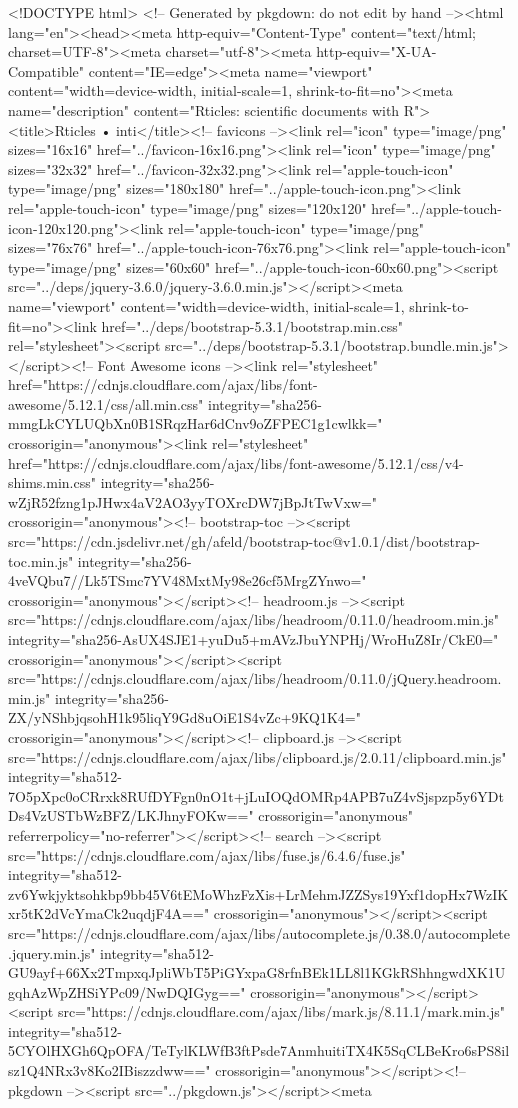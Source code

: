 <!DOCTYPE html>
<!-- Generated by pkgdown: do not edit by hand --><html lang="en"><head><meta http-equiv="Content-Type" content="text/html; charset=UTF-8"><meta charset="utf-8"><meta http-equiv="X-UA-Compatible" content="IE=edge"><meta name="viewport" content="width=device-width, initial-scale=1, shrink-to-fit=no"><meta name="description" content="Rticles: scientific documents with R"><title>Rticles • inti</title><!-- favicons --><link rel="icon" type="image/png" sizes="16x16" href="../favicon-16x16.png"><link rel="icon" type="image/png" sizes="32x32" href="../favicon-32x32.png"><link rel="apple-touch-icon" type="image/png" sizes="180x180" href="../apple-touch-icon.png"><link rel="apple-touch-icon" type="image/png" sizes="120x120" href="../apple-touch-icon-120x120.png"><link rel="apple-touch-icon" type="image/png" sizes="76x76" href="../apple-touch-icon-76x76.png"><link rel="apple-touch-icon" type="image/png" sizes="60x60" href="../apple-touch-icon-60x60.png"><script src="../deps/jquery-3.6.0/jquery-3.6.0.min.js"></script><meta name="viewport" content="width=device-width, initial-scale=1, shrink-to-fit=no"><link href="../deps/bootstrap-5.3.1/bootstrap.min.css" rel="stylesheet"><script src="../deps/bootstrap-5.3.1/bootstrap.bundle.min.js"></script><!-- Font Awesome icons --><link rel="stylesheet" href="https://cdnjs.cloudflare.com/ajax/libs/font-awesome/5.12.1/css/all.min.css" integrity="sha256-mmgLkCYLUQbXn0B1SRqzHar6dCnv9oZFPEC1g1cwlkk=" crossorigin="anonymous"><link rel="stylesheet" href="https://cdnjs.cloudflare.com/ajax/libs/font-awesome/5.12.1/css/v4-shims.min.css" integrity="sha256-wZjR52fzng1pJHwx4aV2AO3yyTOXrcDW7jBpJtTwVxw=" crossorigin="anonymous"><!-- bootstrap-toc --><script src="https://cdn.jsdelivr.net/gh/afeld/bootstrap-toc@v1.0.1/dist/bootstrap-toc.min.js" integrity="sha256-4veVQbu7//Lk5TSmc7YV48MxtMy98e26cf5MrgZYnwo=" crossorigin="anonymous"></script><!-- headroom.js --><script src="https://cdnjs.cloudflare.com/ajax/libs/headroom/0.11.0/headroom.min.js" integrity="sha256-AsUX4SJE1+yuDu5+mAVzJbuYNPHj/WroHuZ8Ir/CkE0=" crossorigin="anonymous"></script><script src="https://cdnjs.cloudflare.com/ajax/libs/headroom/0.11.0/jQuery.headroom.min.js" integrity="sha256-ZX/yNShbjqsohH1k95liqY9Gd8uOiE1S4vZc+9KQ1K4=" crossorigin="anonymous"></script><!-- clipboard.js --><script src="https://cdnjs.cloudflare.com/ajax/libs/clipboard.js/2.0.11/clipboard.min.js" integrity="sha512-7O5pXpc0oCRrxk8RUfDYFgn0nO1t+jLuIOQdOMRp4APB7uZ4vSjspzp5y6YDtDs4VzUSTbWzBFZ/LKJhnyFOKw==" crossorigin="anonymous" referrerpolicy="no-referrer"></script><!-- search --><script src="https://cdnjs.cloudflare.com/ajax/libs/fuse.js/6.4.6/fuse.js" integrity="sha512-zv6Ywkjyktsohkbp9bb45V6tEMoWhzFzXis+LrMehmJZZSys19Yxf1dopHx7WzIKxr5tK2dVcYmaCk2uqdjF4A==" crossorigin="anonymous"></script><script src="https://cdnjs.cloudflare.com/ajax/libs/autocomplete.js/0.38.0/autocomplete.jquery.min.js" integrity="sha512-GU9ayf+66Xx2TmpxqJpliWbT5PiGYxpaG8rfnBEk1LL8l1KGkRShhngwdXK1UgqhAzWpZHSiYPc09/NwDQIGyg==" crossorigin="anonymous"></script><script src="https://cdnjs.cloudflare.com/ajax/libs/mark.js/8.11.1/mark.min.js" integrity="sha512-5CYOlHXGh6QpOFA/TeTylKLWfB3ftPsde7AnmhuitiTX4K5SqCLBeKro6sPS8ilsz1Q4NRx3v8Ko2IBiszzdww==" crossorigin="anonymous"></script><!-- pkgdown --><script src="../pkgdown.js"></script><meta 